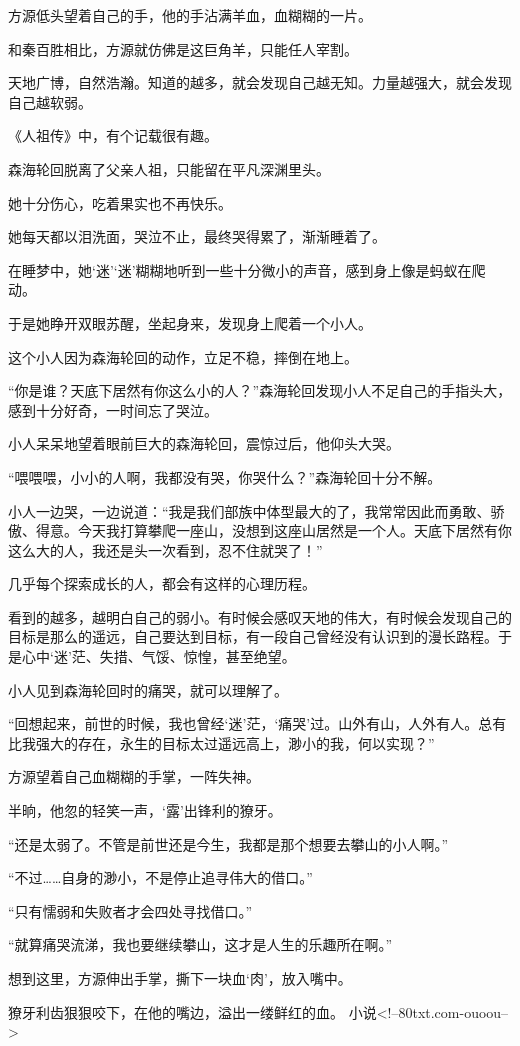 \begin{this_body}
方源低头望着自己的手，他的手沾满羊血，血糊糊的一片。

和秦百胜相比，方源就仿佛是这巨角羊，只能任人宰割。

天地广博，自然浩瀚。知道的越多，就会发现自己越无知。力量越强大，就会发现自己越软弱。

《人祖传》中，有个记载很有趣。

森海轮回脱离了父亲人祖，只能留在平凡深渊里头。

她十分伤心，吃着果实也不再快乐。

她每天都以泪洗面，哭泣不止，最终哭得累了，渐渐睡着了。

在睡梦中，她‘迷’‘迷’糊糊地听到一些十分微小的声音，感到身上像是蚂蚁在爬动。

于是她睁开双眼苏醒，坐起身来，发现身上爬着一个小人。

这个小人因为森海轮回的动作，立足不稳，摔倒在地上。

“你是谁？天底下居然有你这么小的人？”森海轮回发现小人不足自己的手指头大，感到十分好奇，一时间忘了哭泣。

小人呆呆地望着眼前巨大的森海轮回，震惊过后，他仰头大哭。

“喂喂喂，小小的人啊，我都没有哭，你哭什么？”森海轮回十分不解。

小人一边哭，一边说道：“我是我们部族中体型最大的了，我常常因此而勇敢、骄傲、得意。今天我打算攀爬一座山，没想到这座山居然是一个人。天底下居然有你这么大的人，我还是头一次看到，忍不住就哭了！”

几乎每个探索成长的人，都会有这样的心理历程。

看到的越多，越明白自己的弱小。有时候会感叹天地的伟大，有时候会发现自己的目标是那么的遥远，自己要达到目标，有一段自己曾经没有认识到的漫长路程。于是心中‘迷’茫、失措、气馁、惊惶，甚至绝望。

小人见到森海轮回时的痛哭，就可以理解了。

“回想起来，前世的时候，我也曾经‘迷’茫，‘痛哭’过。山外有山，人外有人。总有比我强大的存在，永生的目标太过遥远高上，渺小的我，何以实现？”

方源望着自己血糊糊的手掌，一阵失神。

半晌，他忽的轻笑一声，‘露’出锋利的獠牙。

“还是太弱了。不管是前世还是今生，我都是那个想要去攀山的小人啊。”

“不过……自身的渺小，不是停止追寻伟大的借口。”

“只有懦弱和失败者才会四处寻找借口。”

“就算痛哭流涕，我也要继续攀山，这才是人生的乐趣所在啊。”

想到这里，方源伸出手掌，撕下一块血‘肉’，放入嘴中。

獠牙利齿狠狠咬下，在他的嘴边，溢出一缕鲜红的血。 小说<!--80txt.com-ouoou-->

\end{this_body}

